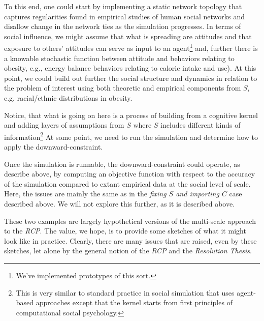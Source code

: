 \documentclass{article}
\begin{document}
To this end, one could start by implementing a static network topology that captures regularities found in empirical studies of human social networks and disallow change in the network ties as the simulation progresses.  In terms of social influence, we might assume that what is spreading are attitudes and that exposure to others' attitudes can serve as input to an agent\footnote{We've implemented prototypes of this sort\cite{orr2017galeabook}.} and, further there is a knowable stochastic function between attitude and behaviors relating to obesity, e.g., energy balance behaviors relating to caloric intake and use). At this point, we could build out further the social structure and dynamics in relation to the problem of interest using both theoretic and empirical components from $S$, e.g. racial/ethnic distributions in obesity.  

Notice, that what is going on here is a process of building from a cognitive kernel and adding layers of assumptions from $S$ where $S$ includes different kinds of information\footnote{This is very similar to standard practice in social simulation that uses agent-based approaches except that the kernel starts from first principles of computational social psychology.}  At some point, we need to run the simulation and determine how to apply the downward-constraint.

Once the simulation is runnable, the downward-constraint could operate, as describe above, by computing an objective function with respect to the accuracy of the simulation compared to extant empirical data at the social level of scale.  Here, the issues are mainly the same as in the \textit{fixing $S$ and importing $C$} case described above. We will not explore this further, as it is described above.

These two examples are largely hypothetical versions of the multi-scale approach to the \textit{RCP}.  The value, we hope, is to provide some sketches of what it might look like in practice.  Clearly, there are many issues that are raised, even by these sketches, let alone by the general notion of the \textit{RCP} and the \textit{Resolution Thesis}. 
\end{document}
